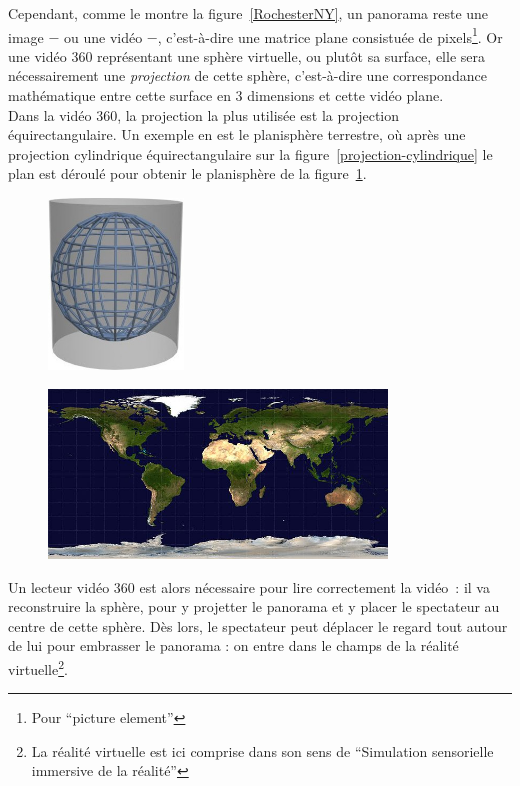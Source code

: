 \newline
Cependant, comme le montre la figure~\ref{RochesterNY}, un panorama reste une image
$-$ ou une vidéo $-$, c'est-à-dire une matrice plane consistuée de pixels\footnote{Pour
 \enquote{picture element}}. Or une vidéo 360 représentant une sphère virtuelle, ou
plutôt sa surface, elle sera nécessairement une \emph{projection} de cette sphère, 
c'est-à-dire une correspondance mathématique entre cette surface en 3 dimensions 
et cette vidéo plane\cite{projection-cartographique}.\\
Dans la vidéo 360, la projection la plus utilisée est la projection équirectangulaire\cite{what-is-equirectangular}.
Un exemple en est le planisphère terrestre, où après une projection cylindrique équirectangulaire
sur la figure~\ref{projection-cylindrique} le plan est déroulé pour obtenir le 
planisphère de la figure~\ref{planisphère}.
\begin{figure}
  \centering
  \begin{minipage}[t]{0.4\textwidth}
    \centering
    \includegraphics[width=3.6cm]{images/Projection-cylindrique.jpg}
    \label{projection-cylindrique}
  \end{minipage}%
  \begin{minipage}[t]{0.6\textwidth}
    \centering
    \includegraphics[width=9cm]{images/Equirectangular-projection.jpg}
    \label{planisphère}
  \end{minipage}
\end{figure}
\newline
Un lecteur vidéo 360 est alors nécessaire pour lire correctement la vidéo~: 
il va reconstruire la sphère, pour y projetter le panorama et y placer le
spectateur au centre de cette sphère. Dès lors, le spectateur peut déplacer le 
regard tout autour de lui pour embrasser le panorama : on entre dans le champs de 
la réalité virtuelle\footnote{La réalité virtuelle est ici comprise dans son sens
  de \enquote{Simulation sensorielle immersive de la réalité}\cite{definition-rv}}.

